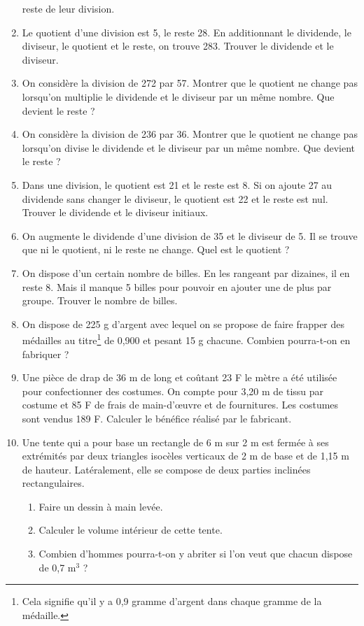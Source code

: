 \documentclass[12 pt]{extarticle}
\theoremstyle{plain}
\begin{document}
\begin{enumerate}
 reste de leur division. 
 \item Le quotient d'une division est 5, le reste 28. 
 En additionnant le dividende, le diviseur, le
 quotient et le reste, on trouve 283. Trouver 
 le dividende et le diviseur.
 \item On considère la division de 272 par 57. Montrer que le quotient ne change pas lorsqu'on multiplie le dividende et le diviseur par un même nombre. Que devient le reste ? 
 \item On considère la division de 236 par 36. Montrer que le quotient ne change pas lorsqu'on divise le dividende et le diviseur par un même nombre. Que devient le reste ? 
 \item Dans une division, le quotient est 21 et le
 reste est 8. Si on ajoute 27 au dividende
 sans changer le diviseur, le quotient est 22 et le
 reste est nul. Trouver le dividende et le diviseur 
 initiaux. 
 \item On augmente le dividende d'une division de 
 35 et le diviseur de 5. Il se trouve que ni le 
 quotient, ni le reste ne change. Quel est le quotient
 ?
 \item On dispose d'un certain nombre de billes. 
 En les rangeant par dizaines, il en reste 8. Mais il manque 5 billes pour pouvoir en ajouter une de plus par groupe. Trouver le nombre de billes. 
 \item On dispose de 225 g d'argent avec lequel on se propose de faire frapper des médailles au titre\footnote{Cela signifie qu'il y a 0,9 gramme d'argent dans chaque gramme de la médaille.} de 
 0,900 et pesant 15 g chacune. Combien pourra-t-on 
 en fabriquer ? 
 \item Une pièce de drap de 36 m de long et coûtant 
 23 F le mètre a été utilisée pour confectionner
 des costumes. On compte pour 3,20 m de tissu par 
 costume et 85 F de frais de main-d'œuvre et de fournitures. Les costumes sont vendus 189 F. Calculer 
 le bénéfice réalisé par le fabricant. 
 \item Une tente qui a pour base un rectangle de 6 m sur 2 m est fermée à ses extrémités par deux triangles isocèles verticaux de 2 m de base et de 1,15 m de 
 hauteur. Latéralement, elle se compose de deux parties inclinées rectangulaires. 
 \begin{enumerate}
 \item Faire un dessin à main levée.
 \item Calculer le volume intérieur de cette tente.  \item Combien d'hommes pourra-t-on
 y abriter si l'on veut que chacun dispose de 0,7 m${}^3$ ?

\end{enumerate}
\end{enumerate}
\end{document}
